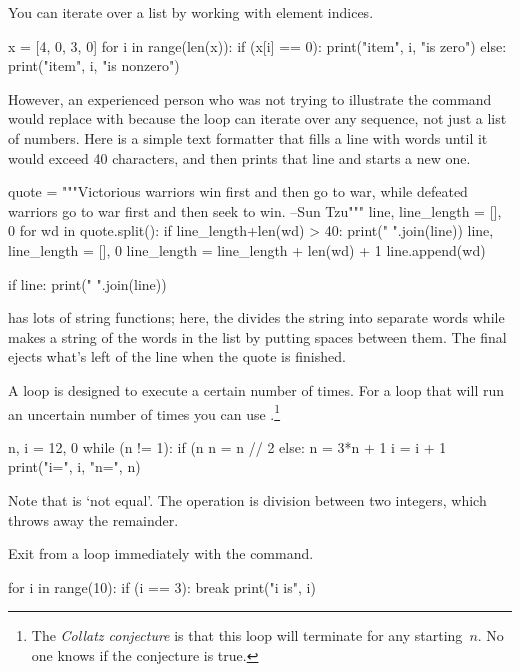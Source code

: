 You can iterate over a list by working with element indices.
\begin{pythonconsole}
x = [4, 0, 3, 0]
for i in range(len(x)):
    if (x[i] == 0):
        print("item", i, "is zero")
    else:
        print("item", i, "is nonzero")

\end{pythonconsole}
\noindent
However, an experienced  \python{} person who was not trying to illustrate 
the  command
would replace 
with  because
the  loop can iterate over any sequence, not just
a list of numbers.
Here is a simple text formatter that fills a line with words until
it would exceed 40 characters, and then
prints that line and starts a new one.
\begin{pythonconsole}
quote = """Victorious warriors win first and then go to war, 
while defeated warriors go to war first and then seek to win. 
--Sun Tzu"""
line, line_length = [], 0
for wd in quote.split():
    if line_length+len(wd) > 40:
        print(" ".join(line))
        line, line_length = [], 0
    line_length = line_length + len(wd) + 1
    line.append(wd)

if line:
    print(" ".join(line))

\end{pythonconsole}
\python{} has lots of string functions; here,
the  divides the string into separate words while
 makes a string of the words in the list 
 by putting spaces between them.
The final  ejects what's left of the line
when the quote is finished.

A  loop is designed to execute a certain
number of times.
For a loop that will run an uncertain number of times
you can use .\footnote{The 
\protect\textit{Collatz conjecture} is 
that this loop will 
terminate for any starting~$n$.
No one knows if the conjecture is true.}
\begin{pythonconsole}
n, i = 12, 0
while (n != 1):
    if (n %
        n = n // 2
    else:
        n = 3*n + 1
    i = i + 1
    print("i=", i, "n=", n)

\end{pythonconsole}
\noindent
Note that  \inlinecode{!=} is `not equal'. 
The \inlinecode{//} operation is division between two integers, which
throws away the remainder.

Exit from a loop immediately with the  command.
\begin{pythonconsole}
for i in range(10):
    if (i == 3):
        break
    print("i is", i)

\end{pythonconsole}

